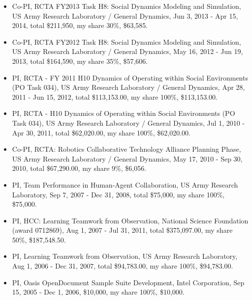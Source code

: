 \begin{itemize}[nosep, noitemsep]
    \item Co-PI, RCTA FY2013 Task H8: Social Dynamics Modeling and Simulation, US Army Research Laboratory / General Dynamics, Jun 3, 2013 - Apr 15, 2014, total \$211,950, my share 30\%, \$63,585.

    \item Co-PI, RCTA FY2012 Task H8: Social Dynamics Modeling and Simulation, US Army Research Laboratory / General Dynamics, May 16, 2012 - Jun 19, 2013, total \$164,590, my share 35\%, \$57,606.

    \item PI, RCTA - FY 2011 H10 Dynamics of Operating within Social Environments (PO Task 034), US Army Research Laboratory / General Dynamics, Apr 28, 2011 - Jun 15, 2012, total \$113,153.00, my share 100\%, \$113,153.00.

    \item PI, RCTA - H10 Dynamics of Operating within Social Environments (PO Task 034), US Army Research Laboratory / General Dynamics, Jul 1, 2010 - Apr 30, 2011, total \$62,020.00, my share 100\%, \$62,020.00.

    \item Co-PI, RCTA: Robotics Collaborative Technology Alliance Planning Phase, US Army Research Laboratory / General Dynamics, May 17, 2010 - Sep 30, 2010, total \$67,290.00, my share 9\%, \$6,056.

    \item PI, Team Performance in Human-Agent Collaboration, US Army Research Laboratory, Sep 7, 2007 - Dec 31, 2008, total \$75,000, my share 100\%, \$75,000.

    \item PI, HCC: Learning Teamwork from Observation, National Science Foundation (award 0712869), Aug 1, 2007 - Jul 31, 2011, total \$375,097.00, my share 50\%, \$187,548.50.

    \item PI, Learning Teamwork from Observation, US Army Research Laboratory, Aug 1, 2006 - Dec 31, 2007, total \$94,783.00, my share 100\%, \$94,783.00.

    \item PI, Oasis OpenDocument Sample Suite Development, Intel Corporation, Sep 15, 2005 - Dec 1, 2006, \$10,000, my share 100\%, \$10,000.


\end{itemize}
